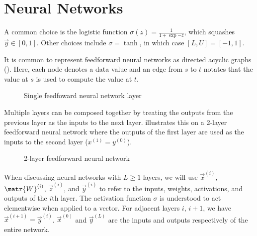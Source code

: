 





\section{Neural Networks}

A common choice is the logistic function $\sigma(z)
= \frac{1}{1+\exp{-z}}$, which squashes $\vec{y} \in [0, 1]$. Other choices
include $\sigma = \tanh$, in which case $[L, U] = [-1, 1]$.

It is common to represent feedforward neural networks as directed acyclic
graphs (). Here, each node denotes a data value and
an edge from $s$ to $t$ notates that the value at $s$ is used to compute the
value at $t$.

\begin{figure}[htpb]
    \centering
    
    \caption{Single feedfoward neural network layer}
    \label{fig:nn-layer}
\end{figure}

Multiple layers can be composed together by treating the outputs from the previous layer
as the inputs to the next layer.  illustrates this on a 2-layer
feedforward neural network where the outputs of the first layer are used as the
inputs to the second layer (\ie $x^{(1)} = y^{(0)}$).


\begin{figure}[htbp]
    \centering
    
    \caption{2-layer feedforward neural network}
    \label{fig:ffw-nn}
\end{figure}

When discussing neural networks with $L \geq 1$ layers, we will use
$\vec{x}^{(i)}$, $\matr{W}^{(i)}$, $\vec{z}^{(i)}$, and $\vec{y}^{(i)}$ to
refer to the inputs, weights, activations, and outputs of the $i$th layer. The
activation function $\sigma$ is understood to act elementwise when applied to a
vector. For adjacent layers $i$, $i+1$, we have $\vec{x}^{(i+1)} =
\vec{y}^{(i)}$. $\vec{x}^{(0)}$ and $\vec{y}^{(L)}$ are the inputs and outputs
respectively of the entire network.

